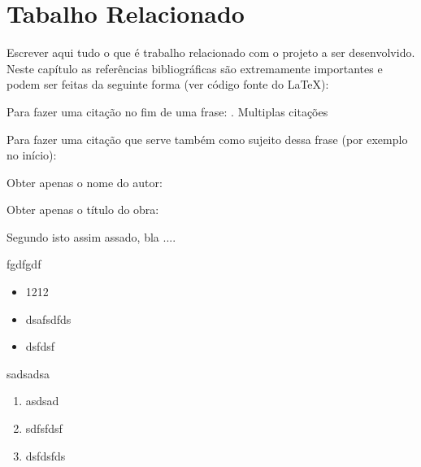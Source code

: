 
\chapter{Tabalho Relacionado}
\label{ch:background}


Escrever aqui tudo o que é trabalho relacionado com o projeto a ser desenvolvido. Neste capítulo as referências bibliográficas são extremamente importantes e podem ser feitas da seguinte forma (ver código fonte do \LaTeX): 

Para fazer uma citação no fim de uma frase: \parencite{Sims1992}. Multiplas citações \parencite{Darwin1859,Koza1992}

Para fazer uma citação que serve também como sujeito dessa frase (por exemplo no início): \textcite{Sims1992}

Obter apenas o nome do autor: \citeauthor{Sims1992}

Obter apenas o título do obra:  


Segundo \textcite{Rudolph2016} isto assim assado, bla .... 


fgdfgdf
\begin{itemize}
    \item 1212
    \item dsafsdfds
    \item dsfdsf
\end{itemize}

sadsadsa
\begin{enumerate}
    \item asdsad
    \item sdfsfdsf
    \item dsfdsfds
\end{enumerate}

